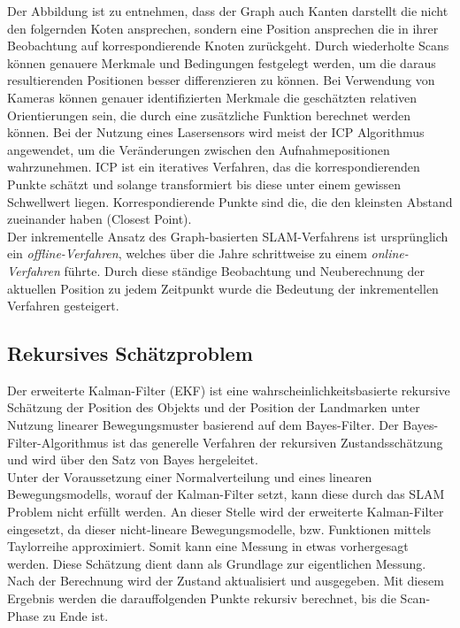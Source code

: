 Der Abbildung ist zu entnehmen, dass der Graph auch Kanten darstellt die nicht den folgernden Koten ansprechen, sondern eine 
Position ansprechen die in ihrer Beobachtung auf korrespondierende Knoten zurückgeht. Durch wiederholte Scans können genauere Merkmale und 
Bedingungen festgelegt werden, um die daraus resultierenden Positionen besser differenzieren zu können. Bei Verwendung von Kameras können 
genauer identifizierten Merkmale die geschätzten relativen Orientierungen sein, die durch eine zusätzliche Funktion berechnet werden 
können. Bei der Nutzung eines Lasersensors wird meist der \ac{ICP} Algorithmus angewendet, um die Veränderungen zwischen den Aufnahmepositionen 
wahrzunehmen. \acs{ICP} ist ein iteratives Verfahren, das die korrespondierenden Punkte schätzt und solange transformiert bis diese unter 
einem gewissen Schwellwert liegen. Korrespondierende Punkte sind die, die den kleinsten Abstand zueinander haben (Closest Point). \cite{robotik2.2020m}
\\ 
Der inkrementelle Ansatz des Graph-basierten \acs{SLAM}-Verfahrens ist ursprünglich ein \textit{offline-Verfahren}, welches über die Jahre 
schrittweise zu einem \textit{online-Verfahren} führte. Durch diese ständige Beobachtung und Neuberechnung der aktuellen Position zu jedem 
Zeitpunkt wurde die Bedeutung der inkrementellen Verfahren gesteigert. %

\subsection*{Rekursives Schätzproblem}
Der erweiterte Kalman-Filter (\acs{EKF}) ist eine wahrscheinlichkeitsbasierte rekursive Schätzung der Position des Objekts und der Position der 
Landmarken unter Nutzung linearer Bewegungsmuster basierend auf dem Bayes-Filter. Der Bayes-Filter-Algorithmus ist das generelle Verfahren der 
rekursiven Zustandsschätzung und wird über den Satz von Bayes hergeleitet. 
\\
Unter der Voraussetzung einer Normalverteilung und eines linearen Bewegungsmodells, worauf der Kalman-Filter setzt, kann diese durch das 
\acs{SLAM} Problem nicht erfüllt werden. An dieser Stelle wird der erweiterte Kalman-Filter eingesetzt, da dieser nicht-lineare 
Bewegungsmodelle, bzw. Funktionen mittels Taylorreihe approximiert. Somit kann eine Messung in etwas vorhergesagt werden. Diese Schätzung 
dient dann als Grundlage zur eigentlichen Messung. Nach der Berechnung wird der Zustand aktualisiert und ausgegeben. Mit diesem Ergebnis 
werden die darauffolgenden Punkte rekursiv berechnet, bis die Scan-Phase zu Ende ist.

